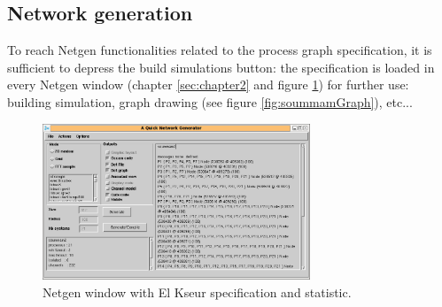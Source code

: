 \subsection{Network generation}

To reach Netgen functionalities related to the process graph specification, 
it is sufficient to depress the build simulations button: the specification is 
loaded in every Netgen window (chapter \ref{sec:chapter2} and figure \ref{fig:soummamNetgen})  
for further use: building simulation, graph drawing (see figure \ref{fig:soummamGraph}), etc... 


\begin{figure}
\begin{center}
\includegraphics[width=8cm]{netgenSoummam.png}
\caption{Netgen window with El Kseur specification and statistic. }
\label{fig:soummamNetgen}
\end{center}
\end{figure}

